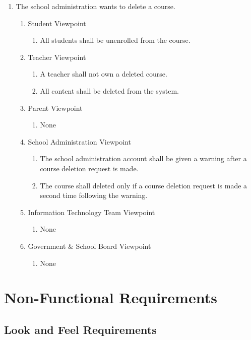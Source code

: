 \documentclass[]{article}
\begin{document}
\begin{enumerate}[{BE}1.]
	\item The school administration wants to delete a course.
	\begin{enumerate}[{VP1}.1]
		\item Student Viewpoint
			\begin{enumerate}
				\item All students shall be unenrolled from the course.
			\end{enumerate}
		\item Teacher Viewpoint
			\begin{enumerate}
				\item A teacher shall not own a deleted course.
				\item{All content shall be deleted from the system.}
			\end{enumerate}
		\item Parent Viewpoint
			\begin{enumerate}
				\item None
			\end{enumerate}
		\item School Administration Viewpoint
			\begin{enumerate}
				\item The school administration account shall be given a warning after a
course
deletion request is made.
\item The course shall deleted only if a course deletion
request is made a second time following the warning.
			\end{enumerate}
		\item Information Technology Team Viewpoint
			\begin{enumerate}
				\item None
			\end{enumerate}
		\item Government \& School Board Viewpoint
			\begin{enumerate}
				\item None
			\end{enumerate}
	\end{enumerate}

\end{enumerate}


\section{Non-Functional Requirements}
\label{sec:non-functional_requirements}
\subsection{Look and Feel Requirements}
\label{sub:look_and_feel_requirements}
\end{document}
